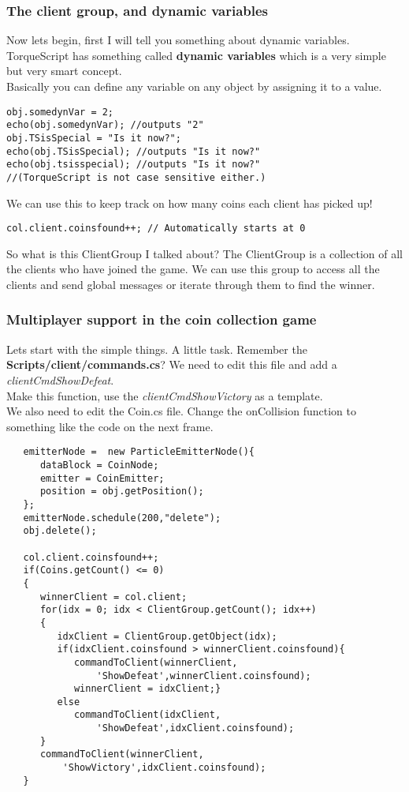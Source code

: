 \begin{frame}[fragile]
\frametitle{The client group, and dynamic variables}
Now lets begin, first I will tell you something about dynamic variables. TorqueScript has something called {\bf dynamic variables} which is a very simple but very smart concept.\\
Basically you can define any variable on any object by assigning it to a value.
\TS
\begin{lstlisting}
obj.somedynVar = 2;
echo(obj.somedynVar); //outputs "2"
obj.TSisSpecial = "Is it now?";
echo(obj.TSisSpecial); //outputs "Is it now?"
echo(obj.tsisspecial); //outputs "Is it now?"
//(TorqueScript is not case sensitive either.)
\end{lstlisting}
We can use this to keep track on how many coins each client has picked up!
\begin{lstlisting}
col.client.coinsfound++; // Automatically starts at 0
\end{lstlisting}
So what is this ClientGroup I talked about? The ClientGroup is a collection of all the clients who have joined the game. We can use this group to access all the clients and send
global messages or iterate through them to find the winner.
\end{frame}

\begin{frame}
\frametitle{Multiplayer support in the coin collection game}
Lets start with the simple things. A little task. Remember the {\bf Scripts/client/commands.cs}? We need to edit this file and add a {\it clientCmdShowDefeat}.\\
Make this function, use the {\it clientCmdShowVictory} as a template.\\
We also need to edit the Coin.cs file. Change the onCollision function to something like the code on the next frame.
\end{frame}
\begin{frame}[fragile]
\TS
\begin{lstlisting}
   emitterNode =  new ParticleEmitterNode(){
      dataBlock = CoinNode;
      emitter = CoinEmitter;
      position = obj.getPosition();
   };
   emitterNode.schedule(200,"delete");
   obj.delete();
   
   col.client.coinsfound++;
   if(Coins.getCount() <= 0)
   {
      winnerClient = col.client;
      for(idx = 0; idx < ClientGroup.getCount(); idx++)
      {
         idxClient = ClientGroup.getObject(idx);
         if(idxClient.coinsfound > winnerClient.coinsfound){
         	commandToClient(winnerClient,
         	    'ShowDefeat',winnerClient.coinsfound);
            winnerClient = idxClient;}
         else
            commandToClient(idxClient,
                'ShowDefeat',idxClient.coinsfound);
      }
      commandToClient(winnerClient,
          'ShowVictory',idxClient.coinsfound);
   }
\end{lstlisting}
\end{frame}

